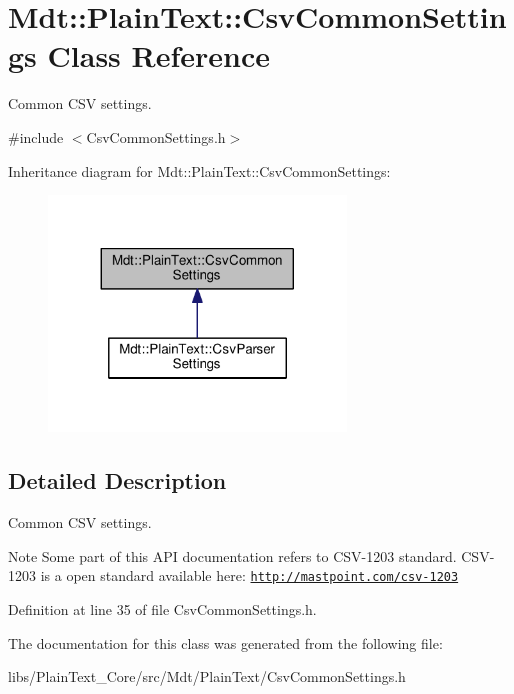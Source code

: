\hypertarget{class_mdt_1_1_plain_text_1_1_csv_common_settings}{}\section{Mdt\+:\+:Plain\+Text\+:\+:Csv\+Common\+Settings Class Reference}
\label{class_mdt_1_1_plain_text_1_1_csv_common_settings}


Common C\+SV settings.  




{\ttfamily \#include $<$Csv\+Common\+Settings.\+h$>$}



Inheritance diagram for Mdt\+:\+:Plain\+Text\+:\+:Csv\+Common\+Settings\+:
\nopagebreak
\begin{figure}[H]
\begin{center}
\leavevmode
\includegraphics[width=224pt]{class_mdt_1_1_plain_text_1_1_csv_common_settings__inherit__graph}
\end{center}
\end{figure}


\subsection{Detailed Description}
Common C\+SV settings. 

\begin{DoxyNote}{Note}
Some part of this A\+PI documentation refers to C\+S\+V-\/1203 standard. C\+S\+V-\/1203 is a open standard available here\+: \href{http://mastpoint.com/csv-1203}{\tt http\+://mastpoint.\+com/csv-\/1203} 
\end{DoxyNote}


Definition at line 35 of file Csv\+Common\+Settings.\+h.



The documentation for this class was generated from the following file\+:\begin{DoxyCompactItemize}
\item 
libs/\+Plain\+Text\+\_\+\+Core/src/\+Mdt/\+Plain\+Text/Csv\+Common\+Settings.\+h\end{DoxyCompactItemize}

